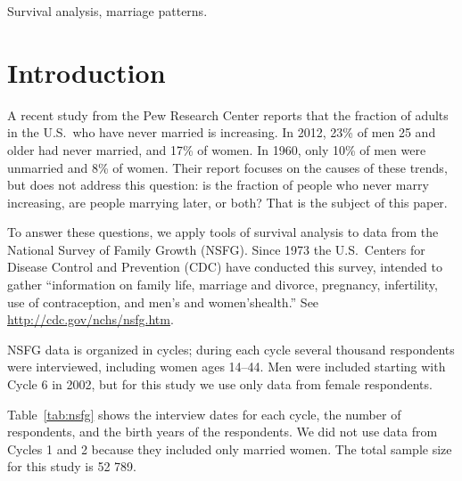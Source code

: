 \documentclass[journal]{IEEEtran}
\begin{document}
\begin{IEEEkeywords}
Survival analysis, marriage patterns.
\end{IEEEkeywords}






%



\section{Introduction}

A recent study from the Pew Research Center\cite{wang14} reports that
the fraction of adults in the U.S.\ who have never married is increasing.
In 2012, 23\% of men 25 and older had never married, and
17\% of women.  In 1960, only 10\% of men were unmarried and 8\% of women.
Their report focuses on the causes of these trends, but does not
address this question: is the fraction of people who never marry
increasing, are people marrying later, or both?  That is the subject
of this paper.

To answer these questions, we apply tools of survival analysis to data
from the National Survey of Family Growth (NSFG).
Since 1973 the U.S.\ Centers for Disease Control and Prevention (CDC)
have conducted this survey, intended to gather ``information on family life, marriage and divorce, pregnancy, infertility, use of contraception, and men's
and women'shealth.'' See \url{http://cdc.gov/nchs/nsfg.htm}.

NSFG data is organized in cycles; during each cycle several thousand
respondents were interviewed, including women ages 14--44.  Men were
included starting with Cycle 6 in 2002, but for this study we use only
data from female respondents.

Table~\ref{tab:nsfg} shows the interview dates for each cycle, the
number of respondents, and the birth years of the respondents.
We did not use data from Cycles 1 and 2 because they included only
married women.  The total sample size for this study is 52 789.  
\end{document}
